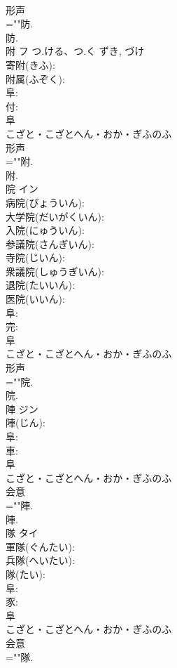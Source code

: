 \documentclass[8pt]{extreport}
\begin{document}
\begin{CJK}{UTF8}{min}
\\	形声 
\\	=""防.
\\	防.
\\	附	フ	つ.ける、つ.く	ずき, づけ	
\\	寄附(きふ): 
\\	附属(ふぞく): 
\\	阜: 
\\	付: 
\\	阜	
\\	こざと・こざとへん・おか・ぎふのふ	
\\	形声 
\\	=""附.
\\	附.
\\	院	イン			
\\	病院(びょういん): 
\\	大学院(だいがくいん): 
\\	入院(にゅういん): 
\\	参議院(さんぎいん): 
\\	寺院(じいん): 
\\	衆議院(しゅうぎいん): 
\\	退院(たいいん): 
\\	医院(いいん): 
\\	阜: 
\\	完: 
\\	阜	
\\	こざと・こざとへん・おか・ぎふのふ	
\\	形声 
\\	=""院.
\\	院.
\\	陣	ジン			
\\	陣(じん): 
\\	阜: 
\\	車: 
\\	阜	
\\	こざと・こざとへん・おか・ぎふのふ	
\\	会意 
\\	=""陣.
\\	陣.
\\	隊	タイ			
\\	軍隊(ぐんたい): 
\\	兵隊(へいたい): 
\\	隊(たい): 
\\	阜: 
\\	豕: 
\\	阜	
\\	こざと・こざとへん・おか・ぎふのふ	
\\	会意 
\\	=""隊.

\end{CJK}
\end{document}
